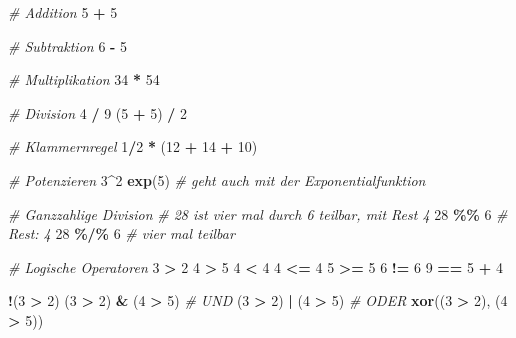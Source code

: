 \documentclass[
]{article}
\newenvironment{Shaded}{\begin{snugshade}}{\end{snugshade}}
\newcommand{\CommentTok}[1]{\textcolor[rgb]{0.56,0.35,0.01}{\textit{#1}}}
\newcommand{\DecValTok}[1]{\textcolor[rgb]{0.00,0.00,0.81}{#1}}
\newcommand{\FunctionTok}[1]{\textcolor[rgb]{0.13,0.29,0.53}{\textbf{#1}}}
\newcommand{\NormalTok}[1]{#1}
\newcommand{\SpecialCharTok}[1]{\textcolor[rgb]{0.81,0.36,0.00}{\textbf{#1}}}
\begin{document}
\begin{Shaded}
\begin{Highlighting}[]
\CommentTok{\# Addition}
\DecValTok{5} \SpecialCharTok{+} \DecValTok{5}

\CommentTok{\# Subtraktion}
\DecValTok{6} \SpecialCharTok{{-}} \DecValTok{5}

\CommentTok{\# Multiplikation}
\DecValTok{34} \SpecialCharTok{*} \DecValTok{54}

\CommentTok{\# Division}
\DecValTok{4} \SpecialCharTok{/} \DecValTok{9}
\NormalTok{(}\DecValTok{5} \SpecialCharTok{+} \DecValTok{5}\NormalTok{) }\SpecialCharTok{/} \DecValTok{2}

\CommentTok{\# Klammernregel}
\DecValTok{1}\SpecialCharTok{/}\DecValTok{2} \SpecialCharTok{*}\NormalTok{ (}\DecValTok{12} \SpecialCharTok{+} \DecValTok{14} \SpecialCharTok{+} \DecValTok{10}\NormalTok{)}

\CommentTok{\# Potenzieren}
\DecValTok{3}\SpecialCharTok{\^{}}\DecValTok{2}
\FunctionTok{exp}\NormalTok{(}\DecValTok{5}\NormalTok{) }\CommentTok{\# geht auch mit der Exponentialfunktion}

\CommentTok{\# Ganzzahlige Division}
\CommentTok{\# 28 ist vier mal durch 6 teilbar, mit Rest 4 }
\DecValTok{28} \SpecialCharTok{\%\%} \DecValTok{6} \CommentTok{\# Rest: 4}
\DecValTok{28} \SpecialCharTok{\%/\%} \DecValTok{6} \CommentTok{\#  vier mal teilbar}

\CommentTok{\# Logische Operatoren}
\DecValTok{3} \SpecialCharTok{\textgreater{}} \DecValTok{2}
\DecValTok{4} \SpecialCharTok{\textgreater{}} \DecValTok{5}
\DecValTok{4} \SpecialCharTok{\textless{}} \DecValTok{4}
\DecValTok{4} \SpecialCharTok{\textless{}=} \DecValTok{4}
\DecValTok{5} \SpecialCharTok{\textgreater{}=} \DecValTok{5}
\DecValTok{6} \SpecialCharTok{!=} \DecValTok{6}
\DecValTok{9} \SpecialCharTok{==} \DecValTok{5} \SpecialCharTok{+} \DecValTok{4}

\SpecialCharTok{!}\NormalTok{(}\DecValTok{3} \SpecialCharTok{\textgreater{}} \DecValTok{2}\NormalTok{)}
\NormalTok{(}\DecValTok{3} \SpecialCharTok{\textgreater{}} \DecValTok{2}\NormalTok{) }\SpecialCharTok{\&}\NormalTok{ (}\DecValTok{4} \SpecialCharTok{\textgreater{}} \DecValTok{5}\NormalTok{) }\CommentTok{\# UND}
\NormalTok{(}\DecValTok{3} \SpecialCharTok{\textgreater{}} \DecValTok{2}\NormalTok{) }\SpecialCharTok{|}\NormalTok{ (}\DecValTok{4} \SpecialCharTok{\textgreater{}} \DecValTok{5}\NormalTok{) }\CommentTok{\# ODER}
\FunctionTok{xor}\NormalTok{((}\DecValTok{3} \SpecialCharTok{\textgreater{}} \DecValTok{2}\NormalTok{), (}\DecValTok{4} \SpecialCharTok{\textgreater{}} \DecValTok{5}\NormalTok{))}
\end{Highlighting}
\end{Shaded}
\end{document}
